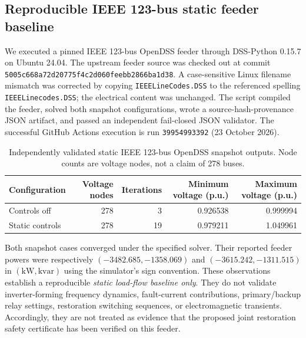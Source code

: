 \subsection{Reproducible IEEE 123-bus static feeder baseline}
\label{sec:ieee123-static-verified}
We executed a pinned IEEE 123-bus OpenDSS feeder through DSS-Python 0.15.7 on Ubuntu 24.04. The upstream feeder source was checked out at commit \texttt{5005c668a72d20775f4c2d060feebb2866ba1d38}. A case-sensitive Linux filename mismatch was corrected by copying \texttt{IEEELineCodes.DSS} to the referenced spelling \texttt{IEEELinecodes.DSS}; the electrical content was unchanged. The script compiled the feeder, solved both snapshot configurations, wrote a source-hash-provenance JSON artifact, and passed an independent fail-closed JSON validator. The successful GitHub Actions execution is run \texttt{39954993392} (23 October 2026).

\begin{table}[H]
\centering
\caption{Independently validated static IEEE 123-bus OpenDSS snapshot outputs. Node counts are voltage nodes, not a claim of 278 buses.}
\label{tab:ieee123-static-verified}
\begin{tabular}{lrrrr}
\toprule
Configuration & Voltage nodes & Iterations & Minimum voltage (p.u.) & Maximum voltage (p.u.)\\
\midrule
Controls off & 278 & 3 & 0.926538 & 0.999994\\
Static controls & 278 & 19 & 0.979211 & 1.049961\\
\bottomrule
\end{tabular}
\end{table}
Both snapshot cases converged under the specified solver. Their reported feeder powers were respectively $(-3482.685,-1358.069)$ and $(-3615.242,-1311.515)$ in $(\mathrm{kW},\mathrm{kvar})$ using the simulator's sign convention. These observations establish a reproducible \emph{static load-flow baseline only}. They do not validate inverter-forming frequency dynamics, fault-current contributions, primary/backup relay settings, restoration switching sequences, or electromagnetic transients. Accordingly, they are not treated as evidence that the proposed joint restoration safety certificate has been verified on this feeder.
